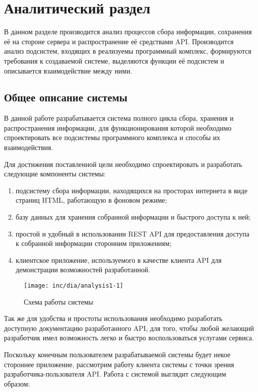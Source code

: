 \chapter{Аналитический раздел}
\label{cha:analysis}
%
%
В данном разделе производится анализ процессов сбора информации, сохранения её на стороне сервера и распространение её средствами API.
Производится анализ подсистем, входящих в реализуемы программный комплекс, формируются требования к создаваемой системе, выделяются функции её подсистем и описывается взаимодействие между ними.

\section{Общее описание системы}
В данной работе разрабатывается система полного цикла сбора, хранения и распространения информации, для функционирования которой необходимо спроектировать все подсистемы программного комплекса и способы их взаимодействия.

Для достижения поставленной цели необходимо спроектировать и разработать следующие компоненты системы:

\begin{enumerate}
\item подсистему сбора информации, находящихся на просторах интернета в виде страниц HTML, работающую в фоновом режиме;
\item базу данных для хранения собранной информации и быстрого доступа к ней;
\item простой и удобный в использовании REST API для предоставления доступа к собранной информации сторонним приложениям;
\item клиентское приложение, используемого в качестве клиента API для демонстрации возможностей разработанной.
\end{enumerate}

\begin{figure}
  \centering
  \texttt{[image: inc/dia/analysis1-1]}
  \caption{Схема работы системы}
  \label{fig:fig01}
\end{figure}

Так же для удобства и простоты использования необходимо разработать доступную документацию разработанного API, для того, чтобы любой желающий разработчик имел возможность легко и быстро воспользоваться услугами сервиса. 

Поскольку конечным пользователем разрабатываемой системы будет некое стороннее приложение, рассмотрим работу клиента системы с точки зрения разработчика-пользователя API. Работа с системой выглядит следующим образом:

